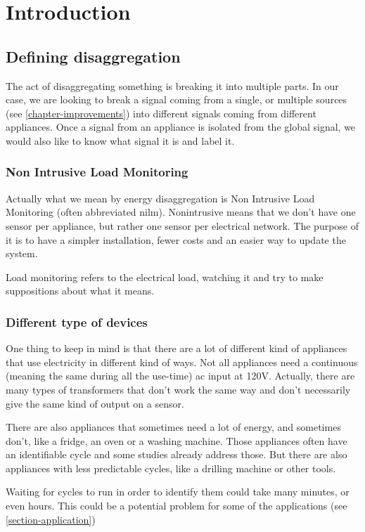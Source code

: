 \chapter{Introduction}
\section{Defining disaggregation}
The act of disaggregating something is breaking it into multiple parts. In our case, we are looking to break a signal coming from a single, or multiple sources (see \autoref{chapter-improvements}) into different signals coming from different appliances. Once a signal from an appliance is isolated from the global signal, we would also like to know what signal it is and label it.

\subsection{Non Intrusive Load Monitoring}
Actually what we mean by energy disaggregation is Non Intrusive Load Monitoring (often abbreviated \acrshort{nilm}). Nonintrusive means that we don't have one sensor per appliance, but rather one sensor per electrical network. The purpose of it is to have a simpler installation, fewer costs and an easier way to update the system.

Load monitoring refers to the electrical load, watching it and try to make suppositions about what it means.

\subsection{Different type of devices}
One thing to keep in mind is that there are a lot of different kind of appliances that use electricity in different kind of ways. Not all appliances need a continuous (meaning the same during all the use-time) \acrshort{ac} input at 120V. Actually, there are many types of transformers \cite{harlow2004electric} that don't work the same way and don't necessarily give the same kind of output on a sensor.

There are also appliances that sometimes need a lot of energy, and sometimes don't, like a fridge, an oven or a washing machine. Those appliances often have an identifiable cycle and some studies already address those. But there are also appliances with less predictable cycles, like a drilling machine or other tools.

Waiting for cycles to run in order to identify them could take many minutes, or even hours. This could be a potential problem for some of the applications (see \autoref{section-application})

